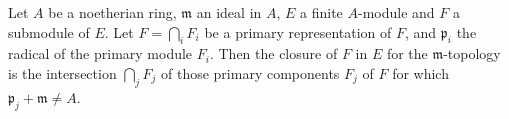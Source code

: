 Let $A$ be a noetherian ring, $\mathfrak{m}$ an ideal in $A$, $E$ a finite $A$-module and $F$ a submodule of $E$. Let $F = \bigcap_i F_i$ be a primary representation of $F$, and $\mathfrak{p}_i$ the radical of the primary module $F_i$. Then the closure of $F$ in $E$ for the $\mathfrak{m}$-topology is the intersection $\bigcap_j F_j$ of those primary components $F_j$ of $F$ for which $\mathfrak{p}_j + \mathfrak{m} \neq A$.